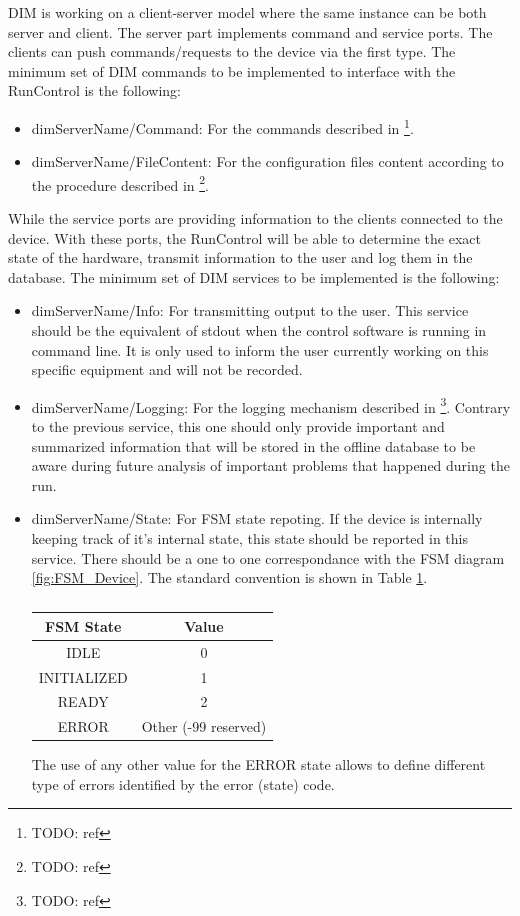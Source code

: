 \documentclass[a4paper]{article}
\newcommand{\note}[1]{\footnote{TODO: {#1}}}
\begin{document}
DIM is working on a client-server model where the same instance can be both server and client.
The server part implements command and service ports. The clients can push commands/requests to
the device via the first type. The minimum set of DIM commands to be implemented to interface with
the RunControl is the following:
\begin{itemize}
	\item dimServerName/Command: For the commands described in \note{ref}.
	\item dimServerName/FileContent: For the configuration files content according to the procedure
	described in \note{ref}.
\end{itemize}
While the service ports are providing information to the clients connected to the device.
With these ports, the RunControl will be able to determine the exact state of the hardware,
transmit information to the user and log them in the database. The minimum set of DIM services to be
implemented is the following:
\begin{itemize}
	\item dimServerName/Info: For transmitting output to the user. This service should be the
	equivalent of stdout when the control software is running in command line. It is only used to
	inform the user currently working on this specific equipment and will not be recorded.
	\item dimServerName/Logging: For the logging mechanism described in \note{ref}. Contrary to the
	previous service, this one should only provide important and summarized information that will be
	stored in the offline database to be aware during future analysis of important problems that
	happened during the run.
	\item dimServerName/State: For FSM state repoting. If the device is internally keeping track of
	it's internal state, this state should be reported in this service. There should be a one to one
	correspondance with the FSM diagram \ref{fig:FSM_Device}. The standard convention is shown in
	Table \ref{table:FSMStates}.
	\begin{table}
		\center
		\begin{tabular}{c|c}
			FSM State & Value\\
			\hline
			IDLE & 0\\
			INITIALIZED & 1\\
			READY & 2\\
			ERROR & Other (-99 reserved)\\
			\hline
		\end{tabular}
		\caption{}
		\label{table:FSMStates}
	\end{table}
	The use of any other value for the ERROR state allows to define different type of errors identified
	by the error (state) code.
\end{itemize}
\end{document}
